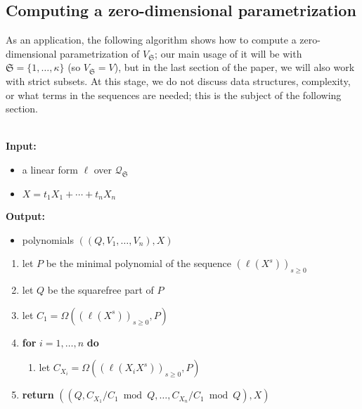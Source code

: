 \documentclass[12pt]{article}
\newcommand{\minpoly}{P}
\newcommand{\lf}{X}
\newcommand{\residueI}{\mathscr{Q}}
\newcommand{\sqfree}{Q}
\def\dg{\kappa}
\begin{document}

\subsection{Computing a zero-dimensional parametrization}  \label{ssec:abstractlago}

As an application, the following algorithm shows how to compute a
zero-dimensional parametrization of $V_{\mathfrak{S}}$; our main usage 
of it will be with $\mathfrak{S}=\{1,\dots,\dg\}$ (so $V_{\mathfrak{S}}=V$),
but in the last section of the paper, we will also work with 
strict subsets. At this stage,
we do not discuss data structures, complexity, or what terms in the
sequences are needed; this is the subject of the following section.

\begin{algorithm}[H]
  \caption{$\mathsf{Parametrization}(\ell,\lf)$}  ~\\
	  {\bf Input:} \vspace{-0.5em}
	  \begin{itemize}\setlength\itemsep{0em}
	  \item  a linear form $\ell$ over $\residueI_\mathfrak{S}$
	  \item $\lf=t_1 X_1 + \cdots + t_n X_n$
	  \end{itemize}
	      {\bf Output:}  \vspace{-0.5em}
              \begin{itemize}
              \item              polynomials $((\sqfree,V_1,\dots,V_n),\lf)$ 
              \end{itemize}
	      \begin{enumerate}\setlength\itemsep{0em}
	      \item let $\minpoly$ be the minimal polynomial of the sequence $(\ell(\lf^s))_{s \ge 0}$
	      \item let $\sqfree$ be the squarefree part of $\minpoly$
	      \item let $C_1 = \Omega((\ell(\lf^s))_{s\ge0} ,\minpoly)$
	      \item \textbf{for} $i=1,\dots,n$ \textbf{do}
		\begin{enumerate}
		\item let $C_{X_i} = \Omega((\ell(X_i \lf^s))_{s\ge0}, \minpoly)$ 
		\end{enumerate}
	      \item \textbf{return} $((\sqfree, C_{X_1}/ C_1 \bmod \sqfree, \dots, C_{X_n}/ C_{1} \bmod \sqfree),\lf)$
	      \end{enumerate}
	      \label{algo:para2}
\end{algorithm}
\end{document}

